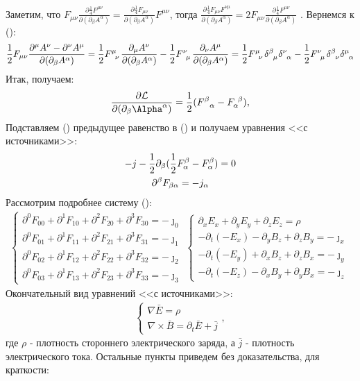 \documentclass[__main__.tex]{subfiles}
\begin{document}
Заметим, что
$F_{\mu\nu}\frac{\partial\frac{1}{4}F^{\mu\nu}}{\partial(\partial_\beta A^\alpha)}=\frac{\partial\frac{1}{4}F_{\mu\nu}}{\partial(\partial_\beta A^\alpha)}F^{\mu\nu}$, тогда $\frac{\partial\frac{1}{4}F_{\mu\nu}F^{\nu\mu}}{\partial(\partial_\beta A^\alpha)}=2F_{\mu\nu}\frac{\partial\frac{1}{4}F^{\mu\nu}}{\partial(\partial_\beta A^\alpha)}$
. Вернемся к ():
\begin{gather}
\frac{1}{2}F_{\mu\nu}\frac{\partial^\mu A^\nu-\partial^\nu A^\mu}{{\partial(\partial_\beta A^\alpha)}}=
\frac{1}{2}F\indices{^{\mu}_\nu}\frac{\partial_\mu A^\nu}{{\partial(\partial_\beta A^\alpha)}}-\frac{1}{2}F\indices{^{\nu}_\mu}\frac{\partial_\nu A^\mu}{{\partial(\partial_\beta A^\alpha)}}=
\frac{1}{2}\tensor{F}{^{\mu}_\nu}\tensor{\delta}{^{\beta}_\mu}\tensor{\delta}{^{\nu}_\alpha}-\frac{1}{2}\tensor{F}{^{\nu}_\mu}\tensor{\delta}{^{\beta}_\nu}\tensor{\delta}{^{\mu}_\alpha}
\end{gather}
Итак, получаем:
\begin{gather}
\frac{\partial \mathcal{L}}{\partial(\partial_\beta\Alpha^\alpha)}
=
\frac{1}{2}(F^\beta_{\ \ \alpha}-F_\alpha^{\ \beta}),
\end{gather}
Подставляем () предыдущее равенство в () и получаем уравнения <<с источниками>>:
\begin{gather}
-j-\frac{1}{2}\partial_\beta(\frac{1}{2}F^\beta_\alpha-F_\alpha^\beta)=0\\
\partial^\beta F_{\beta\alpha}=-j_\alpha \llabel{eq:dbfba}
\end{gather}
Рассмотрим подробнее систему ():
\begin{gather}
\begin{cases}
\partial^0F_{00}+\partial^1F_{10}+\partial^2F_{20}+\partial^3F_{30}=-\jmath_0 \\
\partial^0F_{01}+\partial^1F_{11}+\partial^2F_{21}+\partial^3F_{31}=-\jmath_1 \\
\partial^0F_{02}+\partial^1F_{12}+\partial^2F_{22}+\partial^3F_{32}=-\jmath_2 \\
\partial^0F_{03}+\partial^1F_{13}+\partial^2F_{23}+\partial^3F_{33}=-\jmath_3
\end{cases}
\begin{cases}
\partial_xE_x+\partial_yE_y+\partial_zE_z=\rho          \\
-\partial_t(-E_x)-\partial_yB_z+\partial_zB_y=-\jmath_x \\
-\partial_t(-E_y)+\partial_xB_z+\partial_zB_x=-\jmath_y \\
-\partial_t(-E_z)-\partial_xB_y+\partial_yB_x=-\jmath_z
\end{cases}
\end{gather}
Окончательный вид уравнений <<с источниками>>:\\
\begin{gather}
\begin{cases}
\nabla\bar{E}=\rho \\
\nabla\times\bar{B}=\partial_t\bar{E}+\bar{j}
\end{cases},
\end{gather}
где $\rho$ - плотность стороннего электрического заряда, а $\bar{j}$ - плотность электрического тока. Остальные пункты приведем без доказательства, для краткости:
\end{document}
